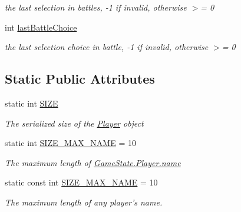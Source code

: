 \begin{DoxyCompactItemize}
\begin{DoxyCompactList}\small\item\em the last selection in battles, -\/1 if invalid, otherwise $>$= 0 \end{DoxyCompactList}\item 
\hypertarget{class_game_state_1_1_player_adf61e3258c2170b7b66355389cca541f}{int \hyperlink{class_game_state_1_1_player_adf61e3258c2170b7b66355389cca541f}{last\-Battle\-Choice}}\label{class_game_state_1_1_player_adf61e3258c2170b7b66355389cca541f}

\begin{DoxyCompactList}\small\item\em the last selection choice in battle, -\/1 if invalid, otherwise $>$= 0 \end{DoxyCompactList}\end{DoxyCompactItemize}
\subsection*{Static Public Attributes}
\begin{DoxyCompactItemize}
\item 
static int \hyperlink{class_game_state_1_1_player_ada2d068d3d5f973f73abac805c162d17}{S\-I\-Z\-E}
\begin{DoxyCompactList}\small\item\em The serialized size of the \hyperlink{class_game_state_1_1_player}{Player} object \end{DoxyCompactList}\item 
static int \hyperlink{class_game_state_1_1_player_a1cdc9de8183b220e87632f7f6a7147d0}{S\-I\-Z\-E\-\_\-\-M\-A\-X\-\_\-\-N\-A\-M\-E} = 10
\begin{DoxyCompactList}\small\item\em The maximum length of \hyperlink{class_game_state_1_1_player_afc2b145df544ca5bffc7c87ef294bcde}{Game\-State.\-Player.\-name} \end{DoxyCompactList}\item 
\hypertarget{class_game_state_1_1_player_a16d0264ca6adfedb582e22f59a550fc5}{static const int \hyperlink{class_game_state_1_1_player_a16d0264ca6adfedb582e22f59a550fc5}{S\-I\-Z\-E\-\_\-\-M\-A\-X\-\_\-\-N\-A\-M\-E} = 10}\label{class_game_state_1_1_player_a16d0264ca6adfedb582e22f59a550fc5}

\begin{DoxyCompactList}\small\item\em The maximum length of any player's name. \end{DoxyCompactList}\end{DoxyCompactItemize}

